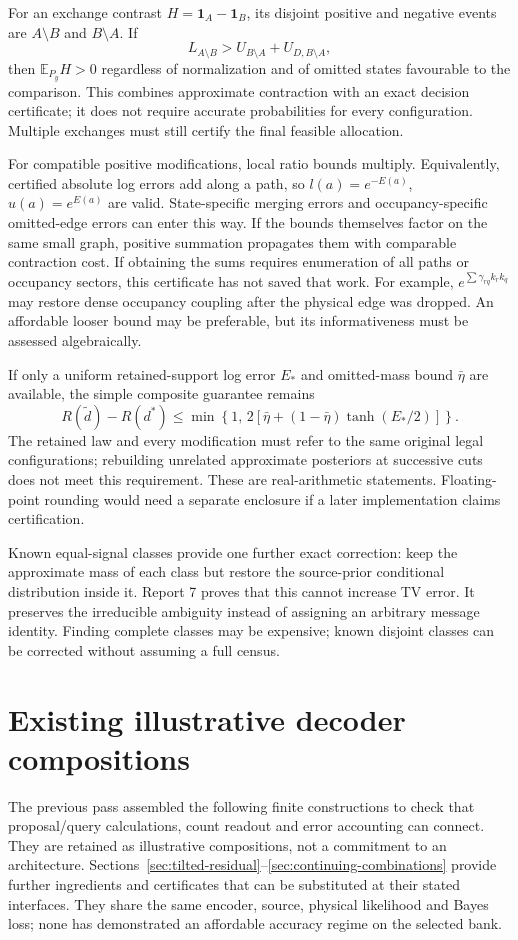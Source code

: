 \documentclass[10pt,a4paper]{article}
\newcommand{\E}{\mathbb E}
\newcommand{\ind}{\mathbf 1}
\begin{document}
For an exchange contrast $H=\ind_A-\ind_B$, its disjoint positive and negative events are
$A\setminus B$ and $B\setminus A$. If
\[
 L_{A\setminus B}>U_{B\setminus A}+U_{D,B\setminus A},
\]
then $\E_{P_y}H>0$ regardless of normalization and of omitted states favourable to the comparison.
This combines approximate contraction with an exact decision certificate; it does not require accurate
probabilities for every configuration. Multiple exchanges must still certify the final feasible allocation.

For compatible positive modifications, local ratio bounds multiply. Equivalently, certified absolute
log errors add along a path, so $l(a)=e^{-E(a)}$, $u(a)=e^{E(a)}$ are valid. State-specific merging errors
and occupancy-specific omitted-edge errors can enter this way. If the bounds themselves factor on the same
small graph, positive summation propagates them with comparable contraction cost. If obtaining the sums
requires enumeration of all paths or occupancy sectors, this certificate has not saved that work. For
example, $e^{\sum\gamma_{rq}k_rk_q}$ may restore dense occupancy coupling after the physical edge was dropped.
An affordable looser bound may be preferable, but its informativeness must be assessed algebraically.

If only a uniform retained-support log error $E_*$ and omitted-mass bound $\bar\eta$ are available, the
simple composite guarantee remains
\begin{equation}
 R(\widetilde d)-R(d^*)\leq
 \min\!\left\{1,\,2\left[\bar\eta+(1-\bar\eta)\tanh(E_*/2)\right]\right\}.
 \label{eq:composite-error}
\end{equation}
The retained law and every modification must refer to the same original legal configurations; rebuilding
unrelated approximate posteriors at successive cuts does not meet this requirement. These are real-arithmetic
statements. Floating-point rounding would need a separate enclosure if a later implementation claims certification.

Known equal-signal classes provide one further exact correction: keep the approximate mass of each class
but restore the source-prior conditional distribution inside it. Report 7 proves that this cannot increase
TV error. It preserves the irreducible ambiguity instead of assigning an arbitrary message identity.
Finding complete classes may be expensive; known disjoint classes can be corrected without assuming a full census.

\clearpage
\section{Existing illustrative decoder compositions}
\label{sec:decoder-synthesis-stage}
The previous pass assembled the following finite constructions to check that proposal/query calculations,
count readout and error accounting can connect. They are retained as illustrative compositions, not a
commitment to an architecture. Sections~\ref{sec:tilted-residual}--\ref{sec:continuing-combinations}
provide further ingredients and certificates that can be substituted at their stated interfaces.
They share the same encoder, source, physical likelihood and Bayes loss; none has demonstrated an affordable
accuracy regime on the selected bank.
\end{document}
